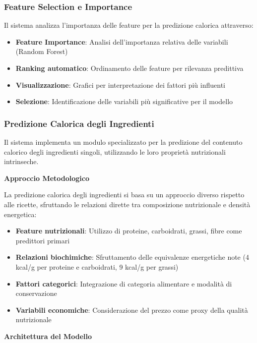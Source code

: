 \documentclass[12pt,a4paper]{article}
\begin{document}
\subsubsection{Feature Selection e Importance}

Il sistema analizza l'importanza delle feature per la predizione calorica attraverso:
\begin{itemize}
    \item \textbf{Feature Importance}: Analisi dell'importanza relativa delle variabili (Random Forest)
    \item \textbf{Ranking automatico}: Ordinamento delle feature per rilevanza predittiva
    \item \textbf{Visualizzazione}: Grafici per interpretazione dei fattori più influenti
    \item \textbf{Selezione}: Identificazione delle variabili più significative per il modello
\end{itemize}

\subsubsection{Predizione Calorica degli Ingredienti}

Il sistema implementa un modulo specializzato per la predizione del contenuto calorico degli ingredienti singoli, utilizzando le loro proprietà nutrizionali intrinseche.

\textbf{Approccio Metodologico}

La predizione calorica degli ingredienti si basa su un approccio diverso rispetto alle ricette, sfruttando le relazioni dirette tra composizione nutrizionale e densità energetica:

\begin{itemize}
    \item \textbf{Feature nutrizionali}: Utilizzo di proteine, carboidrati, grassi, fibre come predittori primari
    \item \textbf{Relazioni biochimiche}: Sfruttamento delle equivalenze energetiche note (4 kcal/g per proteine e carboidrati, 9 kcal/g per grassi)
    \item \textbf{Fattori categorici}: Integrazione di categoria alimentare e modalità di conservazione
    \item \textbf{Variabili economiche}: Considerazione del prezzo come proxy della qualità nutrizionale
\end{itemize}

\textbf{Architettura del Modello}
\end{document}
